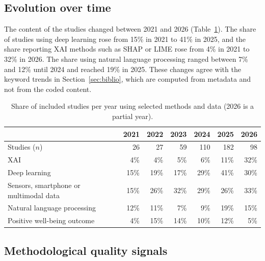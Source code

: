 \documentclass[11pt,a4paper]{article}
\begin{document}
\subsection{Evolution over time}

The content of the studies changed between 2021 and 2026 (Table~\ref{tab:years}). The share of studies using deep learning rose from 15\% in 2021 to 41\% in 2025, and the share reporting XAI methods such as SHAP \cite{lundberg2017shap} or LIME \cite{ribeiro2016lime} rose from 4\% in 2021 to 32\% in 2026. The share using natural language processing ranged between 7\% and 12\% until 2024 and reached 19\% in 2025. These changes agree with the keyword trends in Section~\ref{sec:biblio}, which are computed from metadata and not from the coded content.

\begin{table}[htbp]
\centering
\caption{Share of included studies per year using selected methods and data (2026 is a partial year).}
\label{tab:years}
\small
\begin{tabular}{lrrrrrr}
\toprule
 & 2021 & 2022 & 2023 & 2024 & 2025 & 2026 \\
\midrule
Studies ($n$) & 26 & 27 & 59 & 110 & 182 & 98 \\
XAI & 4\% & 4\% & 5\% & 6\% & 11\% & 32\% \\
Deep learning & 15\% & 19\% & 17\% & 29\% & 41\% & 30\% \\
Sensors, smartphone or multimodal data & 15\% & 26\% & 32\% & 29\% & 26\% & 33\% \\
Natural language processing & 12\% & 11\% & 7\% & 9\% & 19\% & 15\% \\
Positive well-being outcome & 4\% & 15\% & 14\% & 10\% & 12\% & 5\% \\
\bottomrule
\end{tabular}
\end{table}

\subsection{Methodological quality signals}
\end{document}
